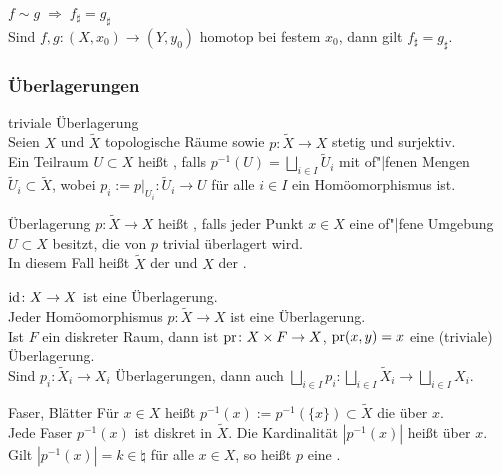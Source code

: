 \begin{Satz}{$f \sim g \;\Rightarrow\; f_\sharp = g_\sharp$}\\
    Sind $f, g\colon (X, x_0) \rightarrow (Y, y_0)$ homotop bei festem $x_0$,
    dann gilt $f_\sharp = g_\sharp$.
\end{Satz}

\subsubsection{%
    Überlagerungen%
}

\begin{Def}{triviale Überlagerung}\\
    Seien $X$ und $\widetilde{X}$ topologische Räume sowie
    $p\colon \widetilde{X} \rightarrow X$ stetig und surjektiv. \\
    Ein Teilraum $U \subset X$ heißt ,
    falls $p^{-1}(U) = \bigsqcup_{i \in I} \widetilde{U}_i$
    mit of"|fenen Mengen $\widetilde{U}_i \subset \widetilde{X}$, wobei
    $p_i := p|_{U_i}\colon \widetilde{U}_i \rightarrow U$ für alle $i \in I$
    ein Homöomorphismus ist.
\end{Def}

\begin{Def}{Überlagerung}
    $p\colon \widetilde{X} \rightarrow X$ heißt , falls
    jeder Punkt $x \in X$ eine of"|fene Umgebung $U \subset X$ besitzt,
    die von $p$ trivial überlagert wird. \\
    In diesem Fall heißt $\widetilde{X}$ der  und
    $X$ der .
\end{Def}

\begin{Bsp}
    $\operatorname{id}\colon X \rightarrow X$ ist eine Überlagerung. \\
    Jeder Homöomorphismus $p\colon \widetilde{X} \rightarrow X$
    ist eine Überlagerung. \\
    Ist $F$ ein diskreter Raum, dann ist $\operatorname{pr}\colon X \times F \rightarrow X$,
    $\operatorname{pr}(x, y) = x$ eine (triviale) Überlagerung. \\
    Sind $p_i\colon \widetilde{X}_i \rightarrow X_i$ Überlagerungen, dann auch
    $\bigsqcup_{i \in I} p_i\colon \bigsqcup_{i \in I} \widetilde{X}_i
    \rightarrow \bigsqcup_{i \in I} X_i$.
\end{Bsp}

\begin{Def}{Faser, Blätter}
    Für $x \in X$ heißt $p^{-1}(x) := p^{-1}(\{x\}) \subset \widetilde{X}$ die
     über $x$. \\
    Jede Faser $p^{-1}(x)$ ist diskret in $\widetilde{X}$.
    Die Kardinalität $|p^{-1}(x)|$ heißt
     über $x$. \\
    Gilt $|p^{-1}(x)| = k \in \natural$ für alle $x \in X$, so heißt $p$ eine
    .
\end{Def}

